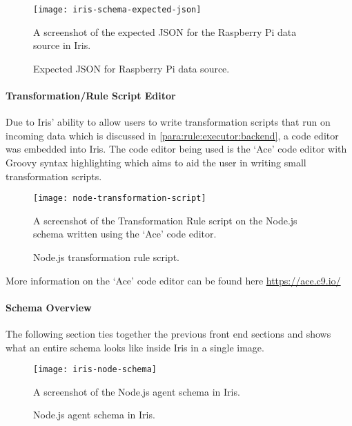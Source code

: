 \documentclass[12pt,a4paper,titlepage]{report}
\begin{document}
\begin{figure}[H]
\begin{tcolorbox}
\begin{center}
\texttt{[image: iris-schema-expected-json]}
\end{center}
A screenshot of the expected JSON for the Raspberry Pi data source in Iris.
\end{tcolorbox}
\caption{Expected JSON for Raspberry Pi data source.}
\end{figure}

\paragraph{Transformation/Rule Script Editor}
Due to Iris' ability to allow users to write transformation scripts that run on incoming data which is discussed in \cref{para:rule:executor:backend}, a code editor was embedded into Iris. The code editor being used is the `Ace' code editor with Groovy syntax highlighting which aims to aid the user in writing small transformation scripts.

\begin{figure}[H]
\begin{tcolorbox}
\begin{center}
\texttt{[image: node-transformation-script]}
\end{center}
A screenshot of the Transformation Rule script on the Node.js schema written using the `Ace' code editor.
\end{tcolorbox}
\caption{Node.js transformation rule script.}
\label{fig:rule:executor}
\end{figure}

More information on the `Ace' code editor can be found here \url{https://ace.c9.io/}

\paragraph{Schema Overview}
The following section ties together the previous front end sections and shows what an entire schema looks like inside Iris in a single image.

\begin{figure}[H]
\begin{tcolorbox}
\begin{center}
\texttt{[image: iris-node-schema]}
\end{center}
A screenshot of the Node.js agent schema in Iris.
\end{tcolorbox}
\caption{Node.js agent schema in Iris.}
\end{figure}
\end{document}
